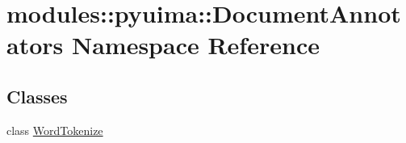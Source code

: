 \hypertarget{namespacemodules_1_1pyuima_1_1DocumentAnnotators}{\section{modules\-:\-:pyuima\-:\-:\-Document\-Annotators \-Namespace \-Reference}
\label{namespacemodules_1_1pyuima_1_1DocumentAnnotators}
}
\subsection*{\-Classes}
\begin{DoxyCompactItemize}
\item 
class \hyperlink{classmodules_1_1pyuima_1_1DocumentAnnotators_1_1WordTokenize}{\-Word\-Tokenize}
\end{DoxyCompactItemize}
